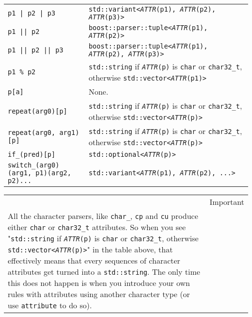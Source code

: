 \begin{longtable}[]{@{}ll@{}}
\texttt{p1 | p2 | p3} & \texttt{std::variant<}\emph{\texttt{ATTR}}\texttt{(p1), }\emph{\texttt{ATTR}}\texttt{(p2), }\emph{\texttt{ATTR}}\texttt{(p3)>} \\
\texttt{p1 || p2} & \texttt{boost::parser::tuple<}\emph{\texttt{ATTR}}\texttt{(p1), }\emph{\texttt{ATTR}}\texttt{(p2)>} \\
\texttt{p1 || p2 || p3} & \texttt{boost::parser::tuple<}\emph{\texttt{ATTR}}\texttt{(p1), }\emph{\texttt{ATTR}}\texttt{(p2), }\emph{\texttt{ATTR}}\texttt{(p3)>} \\
\texttt{p1 \% p2} & \texttt{std::string} if \emph{\texttt{ATTR}}\texttt{(p)} is \texttt{char} or \texttt{char32\_t}, otherwise \texttt{std::vector<}\emph{\texttt{ATTR}}\texttt{(p1)>} \\
\texttt{p{[}a{]}} & None. \\
\texttt{repeat(arg0){[}p{]}} & \texttt{std::string} if \emph{\texttt{ATTR}}\texttt{(p)} is \texttt{char} or \texttt{char32\_t}, otherwise \texttt{std::vector<}\emph{\texttt{ATTR}}\texttt{(p)>} \\
\texttt{repeat(arg0, arg1){[}p{]}} & \texttt{std::string} if \emph{\texttt{ATTR}}\texttt{(p)} is \texttt{char} or \texttt{char32\_t}, otherwise \texttt{std::vector<}\emph{\texttt{ATTR}}\texttt{(p)>} \\
\texttt{if\_(pred){[}p{]}} & \texttt{std::optional<}\emph{\texttt{ATTR}}\texttt{(p)>} \\
\texttt{switch\_(arg0)(arg1, p1)(arg2, p2)...} & \texttt{std::variant<}\emph{\texttt{ATTR}}\texttt{(p1), }\emph{\texttt{ATTR}}\texttt{(p2), ...>} \\
\end{longtable}

\hfill\break

\begin{longtable}[]{@{}
  >{\raggedright\arraybackslash}p{}
  >{\raggedright\arraybackslash}p{}@{}}
\toprule\noalign{}
\endhead
\bottomrule\noalign{}
\endlastfoot
\begin{minipage}[t]{\linewidth}\raggedright
\end{minipage} & Important \\
All the character parsers, like \texttt{char\_}, \texttt{cp} and \texttt{cu} produce either \texttt{char} or \texttt{char32\_t} attributes. So when you see "\texttt{std::string} if \emph{\texttt{ATTR}}\texttt{(p)} is \texttt{char} or \texttt{char32\_t}, otherwise \texttt{std::vector<}\emph{\texttt{ATTR}}\texttt{(p)>}" in the table above, that effectively means that every sequences of character attributes get turned into a \texttt{std::string}. The only time this does not happen is when you introduce your own rules with attributes using another character type (or use \texttt{attribute} to do so). & \\
\end{longtable}

